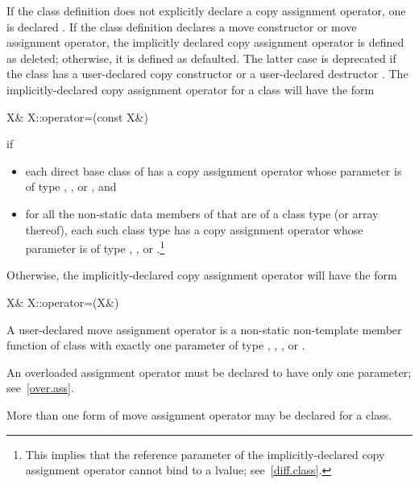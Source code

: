 \pnum
If the class definition does not explicitly declare a copy assignment operator,
one is declared .
If the class definition declares a move
constructor or move assignment operator, the implicitly declared copy
assignment operator is defined as deleted; otherwise, it is defined as
defaulted.
The latter case is deprecated if the class has a user-declared copy constructor
or a user-declared destructor .
The implicitly-declared copy assignment operator for a class
will have the form

\begin{codeblock}
X& X::operator=(const X&)
\end{codeblock}

if

\begin{itemize}
\item
each direct base class  of 
has a copy assignment operator whose parameter is of type
, , or , and
\item
for all the non-static data members of 
that are of a class type  (or array thereof),
each such class type has a copy assignment operator whose parameter is of type
, ,
or .\footnote{This implies that the reference parameter of the
implicitly-declared copy assignment operator cannot bind to a
 lvalue; see~\ref{diff.class}.}
\end{itemize}

Otherwise, the implicitly-declared copy assignment operator
will have the form

\begin{codeblock}
X& X::operator=(X&)
\end{codeblock}

\pnum
A user-declared move assignment operator  is
a non-static non-template member function of class  with exactly
one parameter of type , , , or
. \begin{note} An overloaded assignment operator must be
declared to have only one parameter; see~\ref{over.ass}. \end{note}{}
\begin{note} More
than one form of move assignment operator may be declared for a class. \end{note}

